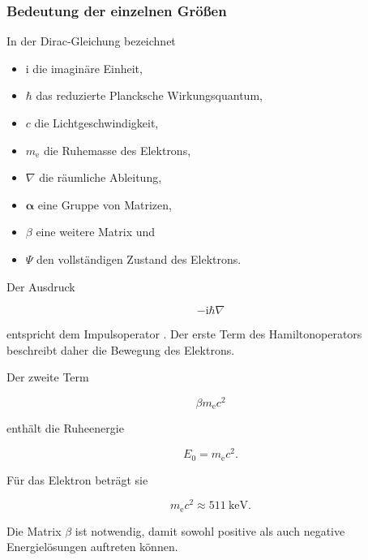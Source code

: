 \subsubsection*{Bedeutung der einzelnen Größen}

In der Dirac-Gleichung bezeichnet

\begin{itemize}
	\item \(\mathrm{i}\) die imaginäre Einheit,
	\item \(\hbar\) das reduzierte Plancksche Wirkungsquantum,
	\item \(c\) die Lichtgeschwindigkeit,
	\item \(m_{\mathrm e}\) die Ruhemasse des Elektrons,
	\item \(\nabla\) die räumliche Ableitung,
	\item \(\boldsymbol{\alpha}\) eine Gruppe von Matrizen,
	\item \(\beta\) eine weitere Matrix und
	\item \(\Psi\) den vollständigen Zustand des Elektrons.
\end{itemize}

Der Ausdruck

\begin{equation}
	-\mathrm{i}\hbar\nabla
\end{equation}

entspricht dem Impulsoperator%
. Der erste Term des Hamiltonoperators beschreibt
daher die Bewegung des Elektrons.

Der zweite Term

\begin{equation}
	\beta m_{\mathrm e}c^2
\end{equation}

enthält die Ruheenergie

\begin{equation}
	E_0
	=
	m_{\mathrm e}c^2.
\end{equation}

Für das Elektron beträgt sie

\begin{equation}
	m_{\mathrm e}c^2
	\approx
	\SI{511}{\kilo\electronvolt}.
	\label{eq:ruheenergie_elektron_dirac}
\end{equation}

Die Matrix \(\beta\) ist notwendig, damit sowohl positive als auch
negative Energielösungen auftreten können.

